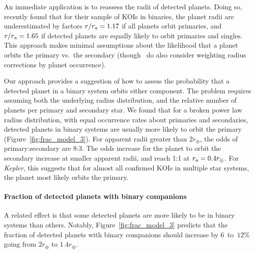 \documentclass[12pt,modern]{aastex61}
\renewcommand{\a}{_{\rm a}}
\begin{document}
An immediate application is to reassess the radii of detected planets.
Doing so, \citet{hirsch_assessing_2017} recently found that for their
sample of KOIs in binaries, the planet radii are underestimated by
factors $r/r\a = 1.17$ if all planets orbit primaries, and $r/r\a =
1.65$ if detected planets are equally likely to orbit primaries and
singles.  This approach makes minimal assumptions about the likelihood
that a planet orbits the primary vs.~the secondary
(though~\citealt{hirsch_assessing_2017} do also consider weighting
radius corrections by planet occurrence).

Our approach provides a suggestion of how to assess the probability
that a detected planet in a binary system orbits either component.
The problem requires assuming both the underlying radius distribution,
and the relative number of planets per primary and secondary star.  We
found that for a broken power law radius distribution, with equal
occurrence rates about primaries and secondaries, detected planets in
binary systems are usually more likely to orbit the primary
(Figure~\ref{fig:frac_model_3}).  For apparent radii greater than
$2r_\oplus$, the odds of primary:secondary are 8:3.  The odds increase
for the planet to orbit the secondary increase at smaller apparent
radii, and reach 1:1 at $r\a=0.4r_\oplus$.  For {\it Kepler}, this
suggests that for almost all confirmed KOIs in multiple star systems,
the planet most likely orbits the primary.


\paragraph{Fraction of detected planets with binary companions}
A related effect is that some detected planets are more likely to be
in binary systems than others.  Notably, Figure~\ref{fig:frac_model_3}
predicts that the fraction of detected planets with binary companions
should increase by $6$~to~$12\%$ going from $2r_\oplus$ to
$1.4r_\oplus$.
\end{document}
